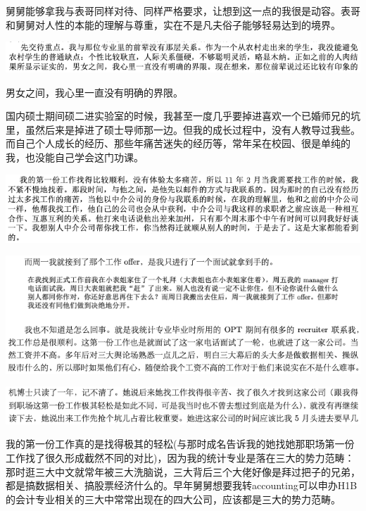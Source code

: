 \documentclass[9pt, b5paper]{article}
\begin{document}
舅舅能够拿我与表哥同样对待、同样严格要求，让想到这一点的我很是动容。表哥和舅舅对人性的本能的理解与尊重，实在不是凡夫俗子能够轻易达到的境界。

\begin{center}
\includegraphics[width=.9\linewidth]{./pic/backups_plans_20210412_104246.png}
\end{center}

男女之间，我心里一直没有明确的界限。

国内硕士期间硕二进实验室的时候，我甚至一度几乎要掉进喜欢一个已婚师兄的坑里，虽然后来是掉进了硕士导师那一边。但我的成长过程中，没有人教导过我些。而自己个人成长的经历、那些年痛苦迷失的经历等，常年呆在校园、很是单纯的我，也没能自己学会这门功课。

\begin{center}
\includegraphics[width=.9\linewidth]{./pic/backups_plans_20210412_104359.png}
\end{center}

\begin{center}
\includegraphics[width=.9\linewidth]{./pic/backups_plans_20210412_113237.png}
\end{center}

\begin{center}
\includegraphics[width=.9\linewidth]{./pic/backups_plans_20210412_113317.png}
\end{center}

我的第一份工作真的是找得极其的轻松(与那时成名告诉我的她找她那职场第一份工作找了很久形成截然不同的对比)，因为我的统计专业是落在三大的势力范畴：那时逛三大中文就常年被三大洗脑说，三大背后三个大佬好像是拜过把子的兄弟，都是搞数据相关、搞股票经济什么的。早年舅舅想要我转accounting可以申办H1B的会计专业相关的三大中常常出现在的四大公司，应该都是三大的势力范畴。
\end{document}
